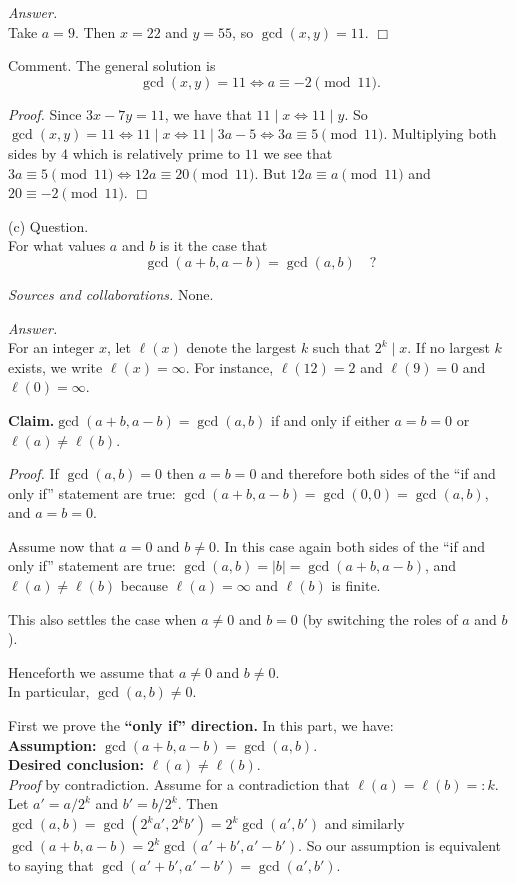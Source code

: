 \documentclass{amsart}
\begin{document}
\medskip\noindent
\emph{Answer.} \\
Take $a=9$.  Then $x=22$ and $y=55$, so $\gcd(x,y)=11$.
\hfill $\Box$

\medskip\noindent
Comment.  The general solution is
  $$\gcd(x,y)=11 \iff a\equiv -2\pmod{11} .$$

\noindent
\emph{Proof.}  Since $3x-7y=11$, we have that $11\mid x \iff 11\mid y$.
So $\gcd(x,y)=11 \iff 11\mid x \iff 11\mid 3a-5 \iff
3a\equiv 5 \pmod{11}$.  Multiplying both sides by $4$ which
is relatively prime to $11$ we see that
$3a\equiv 5 \pmod{11} \iff 12a\equiv 20 \pmod{11}$.
But $12a\equiv a\pmod{11}$ and $20\equiv -2\pmod{11}$.
\hfill $\Box$

\newpage
{}

\medskip{}(c) Question.\\
For what values $a$ and $b$ is it the case that
$$\gcd(a+b,a-b)=\gcd(a,b)\quad\text{?}$$

\medskip\noindent
\emph{Sources and collaborations.}
None.

\medskip\noindent
\emph{Answer.} \\
For an integer $x$, let $\ell(x)$ denote the largest $k$
such that $2^k \mid x$.  If no largest $k$ exists, we write
$\ell(x)=\infty$.
For instance, $\ell(12)=2$ and $\ell(9)=0$ and $\ell(0)=\infty$.

\medskip\noindent
{\bf Claim.}\quad $\gcd(a+b,a-b)=\gcd(a,b)$ if and only if
either $a=b=0$ or $\ell(a)\neq\ell(b)$.

\medskip\noindent
\emph{Proof.}  If $\gcd(a,b)=0$ then $a=b=0$ and therefore
both sides of the ``if and only if'' statement are true:
$\gcd(a+b,a-b)=\gcd(0,0)=\gcd(a,b)$, and $a=b=0$.

\medskip\noindent
Assume now that $a=0$ and $b\neq 0$.  In this case
again both sides of the ``if and only if'' statement are true:
$\gcd(a,b)=|b|=\gcd(a+b,a-b)$, and $\ell(a)\neq \ell(b)$
because $\ell(a)=\infty$ and $\ell(b)$ is finite.

\medskip\noindent
This also settles the case when $a\neq 0$ and $b=0$ (by switching
the roles of $a$ and $b$).

\medskip\noindent
Henceforth we assume that $a\neq 0$ and $b\neq 0$. \\
In particular, $\gcd(a,b)\neq 0$. 

\medskip\noindent
First we prove the {\bf ``only if'' direction.}
In this part, we have:\\
{\bf Assumption:} \quad $\gcd(a+b,a-b)=\gcd(a,b)$. \\
{\bf Desired conclusion:} $\ell(a)\neq \ell(b)$.\\
\emph{Proof} by contradiction.  Assume for a contradiction that
$\ell(a)=\ell(b)=:k$.  Let $a'=a/2^k$ and $b'=b/2^k$.
Then $\gcd(a,b)=\gcd(2^ka',2^kb')=2^k\gcd(a',b')$
and similarly $\gcd(a+b,a-b)=2^k\gcd(a'+b',a'-b')$.
So our assumption is equivalent to saying that
$\gcd(a'+b',a'-b')=\gcd(a',b')$.
\end{document}

